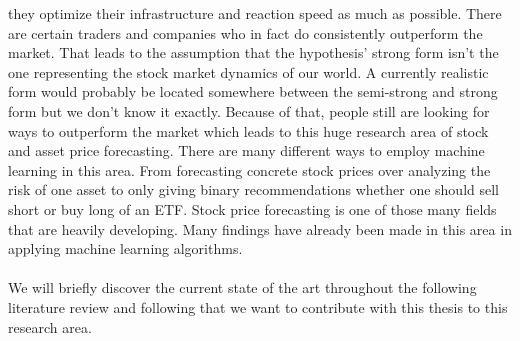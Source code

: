\documentclass[a4paper,12pt]{report}
\begin{document}
they optimize their infrastructure and reaction speed as much as possible. There are certain traders and companies who in fact do consistently outperform the market. That leads to the assumption that the hypothesis’ strong form isn’t the one representing the stock market dynamics of our world. A currently realistic form would probably be located somewhere between the semi-strong and strong form but we don’t know it exactly. Because of that, people still are looking for ways to outperform the market which leads to this huge research area of stock and asset price forecasting. There are many different ways to employ machine learning in this area. From forecasting concrete stock prices over analyzing the risk of one asset to only giving binary recommendations whether one should sell short or buy long of an ETF. Stock price forecasting is one of those many fields that are heavily developing. Many findings have already been made in this area in applying machine learning algorithms. \\
\\
We will briefly discover the current state of the art throughout the following literature review and following that we want to contribute with this thesis to this research area.
\end{document}
